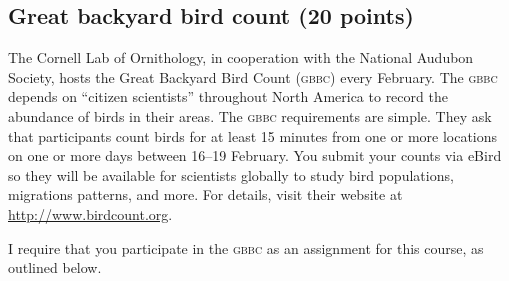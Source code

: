 \documentclass[11pt]{article}
\begin{document}
\thispagestyle{plain}

\subsection*{Great backyard bird count (20 points)}

The Cornell Lab of Ornithology, in cooperation with the National Audubon Society, hosts the Great Backyard Bird Count \textsc{(gbbc)} every February. The \textsc{gbbc} depends on ``citizen scientists'' throughout North America to record the abundance of birds in their areas. The \textsc{gbbc} requirements are simple. They ask that participants count birds for at least 15 minutes from one or more locations on one or more days between 16--19 February. You submit your counts via eBird so they will be available for scientists globally to study bird populations, migrations patterns, and more.  For details, visit their website at \url{http://www.birdcount.org}.\medskip

I require that you participate in the \textsc{gbbc} as an assignment for this course, as outlined below.
\end{document}
